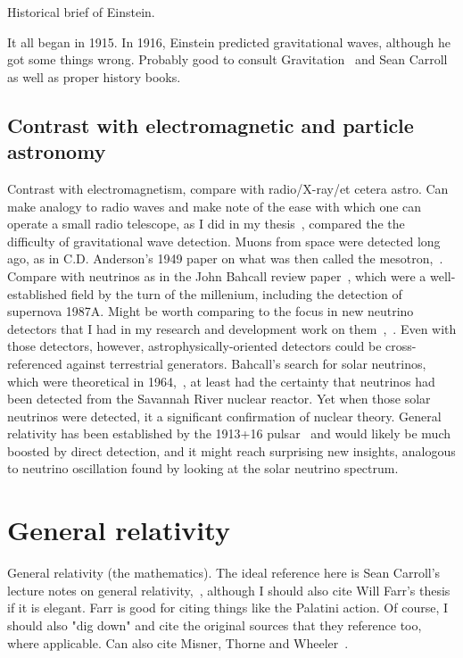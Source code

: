             Historical brief of Einstein.

		It all began in 1915. In 1916, Einstein predicted gravitational waves, although he got some things wrong. Probably good to consult Gravitation~\cite{MisnerThorneWheeler} and Sean Carroll~\cite{Carroll1997} as well as proper history books. 
 
        \subsection{Contrast with electromagnetic and particle astronomy}
        \label{contrast_astro}

            Contrast with electromagnetism, compare with radio/X-ray/et cetera astro. Can make analogy to radio waves and make note of the ease with which one can operate a small radio telescope, as I did in my thesis~\cite{MeadorsThesis2008}, compared the the difficulty of gravitational wave detection. Muons from space were detected long ago, as in C.D. Anderson's 1949 paper on what was then called the mesotron,~\cite{CDAnderson}. Compare with neutrinos as in the John Bahcall review paper~\cite{NeutrinoReview}, which were a well-established field by the turn of the millenium, including the detection of supernova 1987A. Might be worth comparing to the focus in new neutrino detectors that I had in my research and development work on them~\cite{EBubble2005},~\cite{MeadorsNevis2006}. Even with those detectors, however, astrophysically-oriented detectors could be cross-referenced against terrestrial generators. Bahcall's search for solar neutrinos, which were theoretical in 1964,~\cite{NeutrinosSolarTheoretical}, at least had the certainty that neutrinos had been detected from the Savannah River nuclear reactor. Yet when those solar neutrinos were detected, it a significant confirmation of nuclear theory. General relativity has been established by the 1913+16 pulsar~\cite{WeisbergTaylor2004} and would likely be much boosted by direct detection, and it might reach surprising new insights, analogous to neutrino oscillation found by looking at the solar neutrino spectrum.
        

    \section{General relativity}
    \label{general_relativity}

        General relativity (the mathematics). The ideal reference here is Sean Carroll's lecture notes on general relativity,~\cite{Carroll1997}, although I should also cite Will Farr's thesis if it is elegant. Farr is good for citing things like the Palatini action. Of course, I should also "dig down" and cite the original sources that they reference too, where applicable. Can also cite Misner, Thorne and Wheeler~\cite{MisnerThorneWheeler}.

